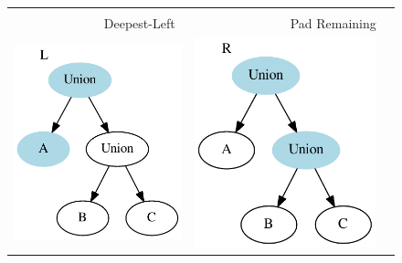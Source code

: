 \documentclass[a4paper,english]{lipics-v2019}
\begin{document}
\begin{figure}
\begin{tabular}{cccc}
& \hspace{5em} & &\\
\multicolumn{2}{c}{Deepest-Left} & \multicolumn{2}{c}{Pad Remaining} \\
\includegraphics[scale=0.6]{figures-gen/example1.pdf} &
\multicolumn{2}{c}{\includegraphics[scale=0.6]{figures-gen/example2.pdf}} &

\end{tabular}
\end{figure}
\end{document}
